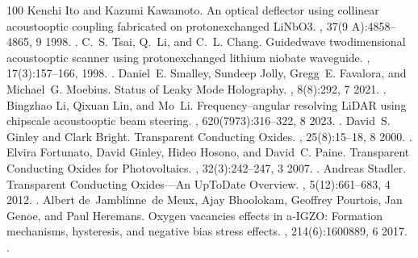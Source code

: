 \documentclass[a4paper,10pt,english,openany,oneside]{jupyterBook}
\begin{document}
\begin{sphinxthebibliography}{100}
\sphinxAtStartPar
Kenchi Ito and Kazumi Kawamoto. An optical deflector using collinear acoustooptic coupling fabricated on proton\sphinxhyphen{}exchanged LiNbO3. , 37(9 A):4858–4865, 9 1998. .
\sphinxAtStartPar
C. S. Tsai, Q. Li, and C. L. Chang. Guided\sphinxhyphen{}wave two\sphinxhyphen{}dimensional acousto\sphinxhyphen{}optic scanner using proton\sphinxhyphen{}exchanged lithium niobate waveguide. , 17(3):157–166, 1998. .
\sphinxAtStartPar
Daniel E. Smalley, Sundeep Jolly, Gregg E. Favalora, and Michael G. Moebius. Status of Leaky Mode Holography. , 8(8):292, 7 2021. .
\sphinxAtStartPar
Bingzhao Li, Qixuan Lin, and Mo Li. Frequency–angular resolving LiDAR using chip\sphinxhyphen{}scale acousto\sphinxhyphen{}optic beam steering. , 620(7973):316–322, 8 2023. .
\sphinxAtStartPar
David S. Ginley and Clark Bright. Transparent Conducting Oxides. , 25(8):15–18, 8 2000. .
\sphinxAtStartPar
Elvira Fortunato, David Ginley, Hideo Hosono, and David C. Paine. Transparent Conducting Oxides for Photovoltaics. , 32(3):242–247, 3 2007. .
\sphinxAtStartPar
Andreas Stadler. Transparent Conducting Oxides—An Up\sphinxhyphen{}To\sphinxhyphen{}Date Overview. , 5(12):661–683, 4 2012. .
\sphinxAtStartPar
Albert de Jamblinne de Meux, Ajay Bhoolokam, Geoffrey Pourtois, Jan Genoe, and Paul Heremans. Oxygen vacancies effects in a‐IGZO: Formation mechanisms, hysteresis, and negative bias stress effects. , 214(6):1600889, 6 2017. .

\end{sphinxthebibliography}
\end{document}
